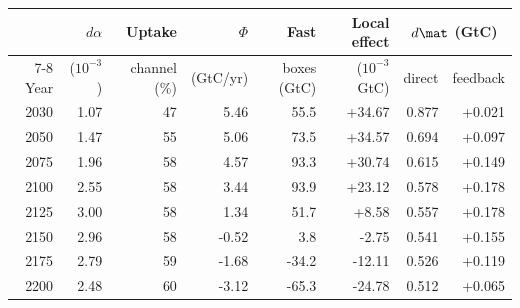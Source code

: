 \begin{tabular}{rrrrrrrr}
\toprule
 & $d\alpha$ & Uptake & $\Phi$ & Fast & Local effect & \multicolumn{2}{c}{$d\mat$ (GtC)} \\
\cmidrule(lr){7-8}
Year & ($10^{-3}$) & channel (\%) & (GtC/yr) & boxes (GtC) & ($10^{-3}$ GtC) & direct & feedback \\
\midrule
2030 & 1.07 & 47 & 5.46 & 55.5 & +34.67 & 0.877 & +0.021 \\
2050 & 1.47 & 55 & 5.06 & 73.5 & +34.57 & 0.694 & +0.097 \\
2075 & 1.96 & 58 & 4.57 & 93.3 & +30.74 & 0.615 & +0.149 \\
2100 & 2.55 & 58 & 3.44 & 93.9 & +23.12 & 0.578 & +0.178 \\
2125 & 3.00 & 58 & 1.34 & 51.7 & +8.58 & 0.557 & +0.178 \\
2150 & 2.96 & 58 & -0.52 & 3.8 & -2.75 & 0.541 & +0.155 \\
2175 & 2.79 & 59 & -1.68 & -34.2 & -12.11 & 0.526 & +0.119 \\
2200 & 2.48 & 60 & -3.12 & -65.3 & -24.78 & 0.512 & +0.065 \\
\bottomrule
\end{tabular}
